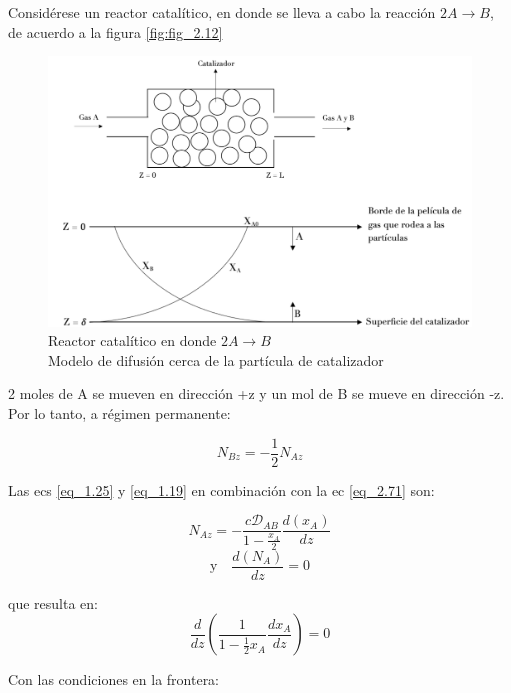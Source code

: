 Considérese un reactor catalítico, en donde se lleva a cabo la reacción $2A\rightarrow B$, de acuerdo a la figura \eqref{fig:fig_2.12}

\begin{figure}[H]
    \centering
    \includegraphics[width=\linewidth]{Capitulo2/Imagenes/Fig_2.12.png}
    \caption{Reactor catalítico en donde $2A\to B$\\Modelo de difusión cerca de la partícula de catalizador}
    \label{fig:fig_2.12}
\end{figure}

2 moles de A se mueven en dirección +z y un mol de B se mueve en dirección -z. Por lo tanto, a régimen permanente:

\begin{equation}
    N_{Bz}=-\frac{1}{2}N_{Az}
    \label{eq_2.71}
\end{equation}

Las ecs \eqref{eq_1.25} y \eqref{eq_1.19} en combinación con la ec \eqref{eq_2.71} son:

\begin{equation}
    N_{Az}=-\frac{c\mathscr{D}_{AB}}{1-\frac{x_A}{2}}\frac{d(x_A)}{dz}
\end{equation}
\begin{equation}
   \text{y} \quad \frac{d(N_A)}{dz}=0
\end{equation}


que resulta en:
\begin{equation}
    \frac{d}{dz}\left(\frac{1}{1-\frac{1}{2}x_A}\frac{dx_A}{dz}\right)=0
    \label{eq_2.74}
\end{equation}




Con las condiciones en la frontera:

